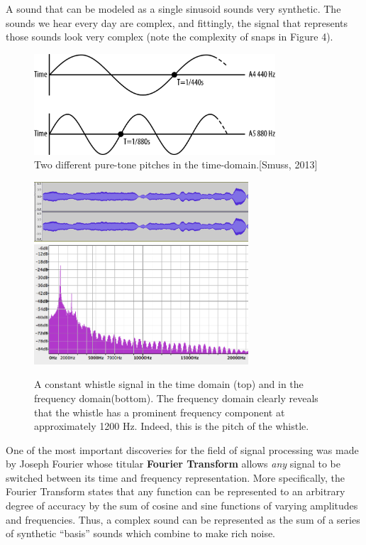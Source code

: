 \documentclass[DIV=calc, paper=a4, fontsize=11pt, twocolumn]{scrartcl}   %
\begin{document}
\par A sound that can be modeled as a single sinusoid sounds very synthetic. The sounds we hear every day are complex, and fittingly, the signal that represents those sounds look very complex (note the complexity of snaps in Figure 4).

\begin{figure}[h]
\centering
\includegraphics[width=90mm]{figures/PitchGraph.png}
\caption{Two different pure-tone pitches in the time-domain.[Smuss, 2013]}
\label{overflow}
\end{figure}

\begin{figure}[h]
\centering
\includegraphics[width=80mm]{figures/whistletimedomain.png}
\includegraphics[width=80mm]{figures/frequencydomainwhistle.png}
\caption{A constant whistle signal in the time domain (top) and in the frequency domain(bottom). The frequency domain clearly reveals that the whistle has a prominent frequency component at approximately 1200 Hz. Indeed, this is the pitch of the whistle. }
\label{overflow}
\end{figure}

   One of the most important discoveries for the field of signal processing was made by Joseph Fourier whose titular \textbf{Fourier Transform} allows \textit{any} signal to be switched between its time and frequency representation. More specifically, the Fourier Transform states that any function can be represented to an arbitrary degree of accuracy by the sum of cosine and sine functions of varying amplitudes and frequencies. Thus, a complex sound can be represented as the sum of a series of synthetic ``basis'' sounds which combine to make rich noise.
\end{document}
